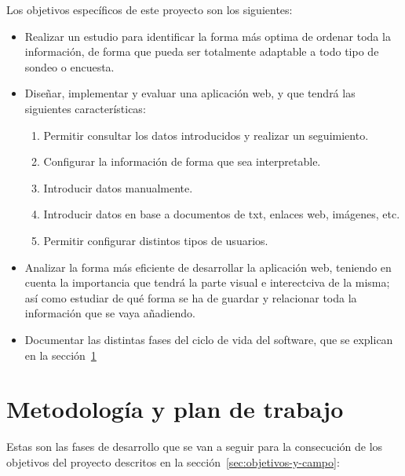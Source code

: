 Los objetivos específicos de este proyecto son los siguientes:

\begin{itemize}
\item Realizar un estudio para identificar la forma más optima de ordenar toda la información, de forma que pueda ser totalmente adaptable a todo tipo de sondeo o encuesta.
\item Diseñar, implementar y evaluar una aplicación web, y que tendrá las
  siguientes características:

  \begin{enumerate}
  \item Permitir consultar los datos introducidos y realizar un seguimiento.
  \item Configurar la información de forma que sea interpretable.
  \item Introducir datos manualmente.
  \item Introducir datos en base a documentos de txt, enlaces web, imágenes, etc.
  \item Permitir configurar distintos tipos de usuarios.
  \end{enumerate}

\item Analizar la forma más eficiente de desarrollar la aplicación web, teniendo en cuenta la importancia que tendrá la parte visual e interectciva de la misma; así como estudiar de qué forma se ha de guardar y relacionar toda la información que se vaya añadiendo.

\item Documentar las distintas fases del ciclo de vida del software, que se explican en la sección~\ref{sec:metodologia-y-plan}

\end{itemize}


\section{Metodología y plan de trabajo}
\label{sec:metodologia-y-plan}

Estas son las fases de desarrollo que se van a seguir para la
consecución de los objetivos del proyecto descritos en la sección~\ref{sec:objetivos-y-campo}:

